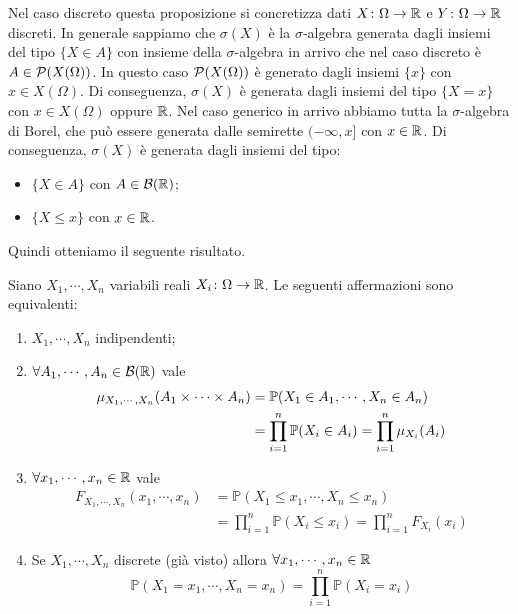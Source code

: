 \documentclass[a4paper]{article}
\begin{document}
Nel caso discreto questa proposizione si concretizza dati \(X \colon \Omega \to \mathbb{R}\)
e \(Y \colon \Omega \to \mathbb{R}\) discreti.
In generale sappiamo che \(\sigma(X)\) è la \(\sigma\)-algebra
generata dagli insiemi del tipo \(\{X \in A\}\)
con insieme della \(\sigma\)-algebra in arrivo che nel caso discreto
è \(A \in \mathcal P(X(\Omega))\).
In questo caso \(\mathcal P(X(\Omega))\) è generato dagli insiemi
\(\{x\}\) con \(x \in X(\Omega)\). Di conseguenza,
\(\sigma(X)\) è generata dagli insiemi del tipo
\(\{X = x\}\) con \(x \in X(\Omega)\) oppure \(\mathbb{R}\).
Nel caso generico in arrivo abbiamo tutta la \(\sigma\)-algebra di Borel,
che può essere generata dalle semirette \((-\infty, x]\)
con \(x \in \mathbb{R}\). Di conseguenza,
\(\sigma(X)\) è generata dagli insiemi del tipo:
\begin{itemize}
    \item \(\{X \in A\}\) con \(A \in \mathcal B(\mathbb{R})\);
    \item \(\{X \leq x\}\) con \(x \in \mathbb{R}\).
\end{itemize}

Quindi otteniamo il seguente risultato.

\begin{snippettheorem}{}
    Siano \(X_1, \cdots, X_n\) variabili reali \(X_i \colon \Omega \to \mathbb{R}\).
    Le seguenti affermazioni sono equivalenti:
    \begin{enumerate}
        \item \(X_1, \cdots, X_n\) indipendenti;
        \item \(\forall A_1, \cdots, A_n \in \mathcal B(\mathbb{R})\)
            vale
            \begin{align*}
                \mu_{X_1, \cdots, X_n}(A_1 \times \cdots \times A_n)
                &= \mathbb P(X_1 \in A_1, \cdots, X_n \in A_n) \\
                &= \prod_{i=1}^n \mathbb P(X_i \in A_i)
                = \prod_{i=1}^n \mu_{X_i}(A_i)
            \end{align*}
        \item \(\forall x_1, \cdots, x_n \in \mathbb{R}\) vale
            \begin{align*}
                F_{X_1, \cdots, X_n}(x_1, \cdots, x_n)
                &= \mathbb P(X_1 \leq x_1, \cdots, X_n \leq x_n) \\
                &= \prod_{i=1}^n \mathbb P(X_i \leq x_i)
                = \prod_{i=1}^n F_{X_i}(x_i)
            \end{align*}
        \item Se \(X_1, \cdots, X_n\) discrete (già visto)
            allora \(\forall x_1, \cdots, x_n \in \mathbb{R}\)
            \[
                \mathbb P(X_1 = x_1, \cdots, X_n = x_n)
                = \prod_{i=1}^n \mathbb P(X_i = x_i)
            \]
    \end{enumerate}
\end{snippettheorem}
\end{document}
